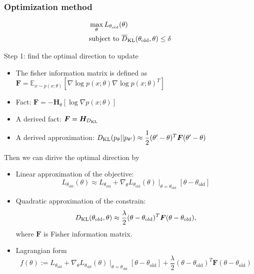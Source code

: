 \documentclass[9pt]{beamer}
\theoremstyle{remark}
\begin{document}
\begin{frame}
    \frametitle{Optimization method}
        \begin{align*}
            &\max_{\theta} L_{\theta_{old}} (\theta)  \\
            &\text{subject to } \overline{D}_{\rm KL} (\theta_{\rm old}, \theta) \leq \delta
        \end{align*} 

    Step 1: find the optimal direction to update
    \begin{itemize}
        \item The fisher information matrix is defined as $ \bm{F} = \mathbb{E}_{x \sim p(x; \theta)} [\nabla \log p(x; \theta) \nabla \log p(x; \theta)^T ]$
        \item Fact: $ \bm{F} = - \bm{H}_{\theta} [\log \nabla p(x; \theta)] $
        \item A derived fact: $\bm{F} = \bm{H}_{D_{\rm KL}}$ 
        \item A derived approximation:
            $ D_{\rm KL}(p_{\theta} || p_{\theta'}) \approx \dfrac{1}{2} (\theta' - \theta)^T \bm{F} (\theta' - \theta) $

    \end{itemize}
    Then we can dirive the optimal direction by
    \begin{itemize}
        \item Linear approximation of the objective:
\[
    L_{\theta_{\text{old}}}(\theta) \approx L_{\theta_{\text{old}}} + \nabla_{\theta} L_{\theta_{\text{old}}}(\theta)\mid_{\theta = \theta_{\text{old}}} [ \theta - \theta_{\text{old}} ] 
\] 
    \item Quadratic approximation of the constrain:
\[
    D_{\rm KL}(\theta_{\text{old}}, \theta) \approx \dfrac{\lambda}{2} (\theta - \theta_{\text{old}})^T \bm{F} (\theta - \theta_{\text{old}}),
\] where $\bm{F}$ is Fisher information matrix.
\item Lagrangian form 
\[
    f(\theta) := L_{\theta_{\text{old}}} + \nabla_{\theta} L_{\theta_{\text{old}}}(\theta)\mid_{\theta = \theta_{\text{old}}} [ \theta - \theta_{\text{old}} ] 
    + \dfrac{\lambda}{2} (\theta - \theta_{\text{old}})^T \bm{F} (\theta - \theta_{\text{old}})
\] 
    \end{itemize}

\end{frame}
\end{document}
